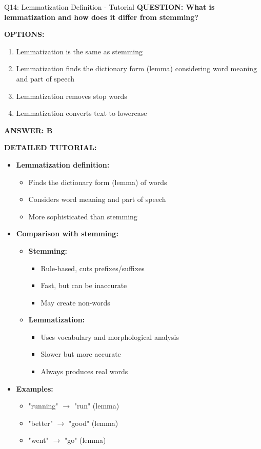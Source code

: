 \documentclass[8pt]{beamer}
\begin{document}
	\begin{frame}{Q14: Lemmatization Definition - Tutorial}
		\fontsize{6.5}{7.5}\selectfont
		\textbf{QUESTION: What is lemmatization and how does it differ from stemming?}
		
		\vspace{0.1cm}
		\textbf{OPTIONS:}
		\begin{enumerate}
			\item Lemmatization is the same as stemming
			\item Lemmatization finds the dictionary form (lemma) considering word meaning and part of speech
			\item Lemmatization removes stop words
			\item Lemmatization converts text to lowercase
		\end{enumerate}
		
		\vspace{0.1cm}
		\textcolor{myblue}{\textbf{ANSWER: B}}
		
		\vspace{0.1cm}
		\textbf{DETAILED TUTORIAL:}
		\begin{itemize}
			\item \textbf{Lemmatization definition:}
			\begin{itemize}
				\item Finds the dictionary form (lemma) of words
				\item Considers word meaning and part of speech
				\item More sophisticated than stemming
			\end{itemize}
			\item \textbf{Comparison with stemming:}
			\begin{itemize}
				\item \textbf{Stemming:}
				\begin{itemize}
					\item Rule-based, cuts prefixes/suffixes
					\item Fast, but can be inaccurate
					\item May create non-words
				\end{itemize}
				\item \textbf{Lemmatization:}
				\begin{itemize}
					\item Uses vocabulary and morphological analysis
					\item Slower but more accurate
					\item Always produces real words
				\end{itemize}
			\end{itemize}
			\item \textbf{Examples:}
			\begin{itemize}
				\item "running" $\rightarrow$ "run" (lemma)
				\item "better" $\rightarrow$ "good" (lemma)
				\item "went" $\rightarrow$ "go" (lemma)
			\end{itemize}
		\end{itemize}
		

\end{frame}
\end{document}
